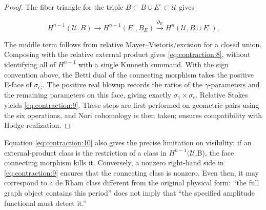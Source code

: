 \documentclass[11pt,a4paper,oneside]{article}
\theoremstyle{plain}
\theoremstyle{definition}
\theoremstyle{remark}
\numberwithin{equation}{section}
\begin{document}
\begin{proof}

The fiber triangle for the triple \(B\subset B\cup E^\circ\subset \)\(\mathcal U\) gives

\begin{equation}
H^{n-1}(\mathcal U,B)\longrightarrow H^{n-1}(E^\circ,B_E)
 \xrightarrow{\partial_E}H^n(\mathcal U,B\cup E^\circ).            \label{eq:contraction:10}
\end{equation}

The middle term follows from relative Mayer--Vietoris/excision for a closed union. Composing with the relative external product gives \eqref{eq:contraction:8}, without identifying all of \(H^{n- 1}\) with a single Kunneth summand. With the sign convention above, the Betti dual of the connecting morphism takes the positive E-face of \(\sigma _G\). The positive real blowup records the ratios of the \(\gamma \)-parameters and the remaining parameters on this face, giving exactly \(\sigma _\gamma \times \sigma _c\). Relative Stokes yields \eqref{eq:contraction:9}. These steps are first performed on geometric pairs using the six operations, and Nori cohomology is then taken; \cite{tubach} ensures compatibility with Hodge realization.

\end{proof}

Equation \eqref{eq:contraction:10} also gives the precise limitation on visibility: if an external-product class is the restriction of a class in \(H^{n- 1}(\)\(\mathcal U\),B), the face connecting morphism kills it. Conversely, a nonzero right-hand side in \eqref{eq:contraction:9} ensures that the connecting class is nonzero. Even then, it may correspond to a de Rham class different from the original physical form: ``the full graph object contains this period'' does not imply that ``the specified amplitude functional must detect it.''
\end{document}
